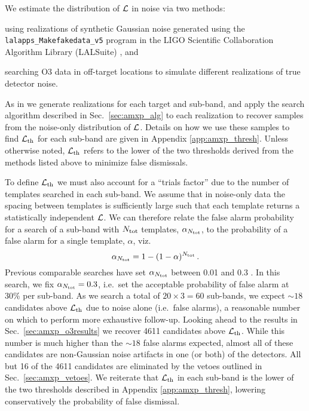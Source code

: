 We estimate the distribution of $\mathcal{L}$ in noise via two methods: \begin{enumerate*} \item using realizations of synthetic Gaussian noise generated using the \texttt{lalapps\_Makefakedata\_v5} program in the LIGO Scientific Collaboration Algorithm Library (LALSuite) \cite{LAL2018}, and \item searching O3 data in off-target locations to simulate different realizations of true detector noise.\end{enumerate*} As in \citet{o2vitsco, Middleton2020} we generate realizations for each target and sub-band, and apply the search algorithm described in Sec.~\ref{sec:amxp_alg} to each realization to recover samples from the noise-only distribution of $\mathcal{L}$. Details on how we use these samples to find $\mathcal{L}_{\rm th}$ for each sub-band are given in Appendix \ref{app:amxp_thresh}. Unless otherwise noted, $\mathcal{L}_{\rm th}$ refers to the lower of the two thresholds derived from the methods listed above to minimize false dismissals.

To define $\mathcal{L}_{\rm th}$ we must also account for a ``trials factor'' due to the number of templates searched in each sub-band. We assume that in noise-only data the spacing between templates is sufficiently large such that each template returns a statistically independent $\mathcal{L}$. We can therefore relate the false alarm probability for a search of a sub-band with $N_{\rm tot}$ templates, $\alpha_{N_{\rm tot}}$, to the probability of a false alarm for a single template, $\alpha$, viz.~
\begin{equation}
\alpha_{N_{\rm tot}} = 1 - (1 - \alpha)^{N_{\rm tot}}\,. \label{eq:amxp_alphan}
\end{equation}
Previous comparable searches have set $\alpha_{N_{\rm tot}}$ between 0.01 and 0.3 \cite{o1crosscorSco, o1vitsco, o2vitsco, Middleton2020}. In this search, we fix $\alpha_{N_{\rm tot}} = 0.3$, i.e.~set the acceptable probability of false alarm at 30\% per sub-band. As we search a total of $20 \times 3 = 60$ sub-bands, we expect $\sim 18$ candidates above $\mathcal{L}_{\rm th}$ due to noise alone (i.e.~false alarms), a reasonable number on which to perform more exhaustive follow-up. Looking ahead to the results in Sec.~\ref{sec:amxp_o3results} we recover 4611 candidates above $\mathcal{L}_{\rm th}$. While this number is much higher than the $\sim 18$ false alarms expected, almost all of these candidates are non-Gaussian noise artifacts in one (or both) of the detectors. All but 16 of the 4611 candidates are eliminated by the vetoes outlined in Sec.~\ref{sec:amxp_vetoes}. We reiterate that $\mathcal{L}_{\rm th}$ in each sub-band is the lower of the two thresholds described in Appendix \ref{app:amxp_thresh}, lowering conservatively the probability of false dismissal. 

